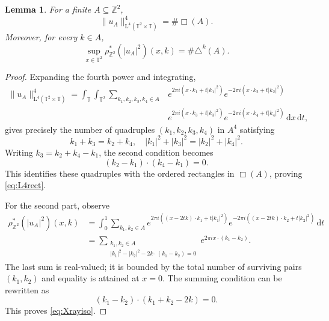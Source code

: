 \documentclass[11pt,reqno]{amsart}
\newtheorem{lemma}[theorem]{Lemma}
\numberwithin{equation}{section}
\newcommand{\dd}{\,\mathrm{d}}
\begin{document}
\begin{lemma}\label{lem:counts}
For a finite $A\subseteq\mathbb{Z}^2$,
\begin{equation}\label{eq:L4rect}
\|u_A\|_{\mathrm{L}^4(\mathbb{T}^2\times\mathbb{T})}^4 = \#\Box(A).
\end{equation}
Moreover, for every $k\in A$,
\begin{equation}\label{eq:Xrayiso}
\sup_{x\in\mathbb{T}^2}\rho^{\ast}_{\mathbb{Z}^2}(|u_A|^2)(x,k) = \#\triangle^k(A).
\end{equation}
\end{lemma}

\begin{proof}
Expanding the fourth power and integrating,
\begin{align*} 
\|u_A\|_{\mathrm{L}^4(\mathbb{T}^2\times\mathbb{T})}^4 =   \int_{\mathbb{T}} \int_{\mathbb{T}^2} \sum_{k_1,k_2,k_3,k_4\in A} & e^{2\pi i(x\cdot k_1+t|k_1|^2)} e^{-2\pi i(x\cdot k_2+t|k_2|^2)} \\
& e^{2\pi i(x\cdot k_3+t|k_3|^2)} e^{-2\pi i(x\cdot k_4+t|k_4|^2)} \dd x \dd t, 
\end{align*}
gives precisely the number of quadruples $(k_1,k_2,k_3,k_4)$ in $A^4$ satisfying
\[ k_1+k_3=k_2+k_4, \quad |k_1|^2+|k_3|^2=|k_2|^2+|k_4|^2. \]
Writing $k_3=k_2+k_4-k_1$, the second condition becomes
\[ (k_2-k_1)\cdot(k_4-k_1)=0. \]
This identifies these quadruples with the ordered rectangles in $\Box(A)$, proving \eqref{eq:L4rect}.

For the second part, observe
\begin{align*}
\rho^{\ast}_{\mathbb{Z}^2}(|u_A|^2)(x,k)
& =\int_0^1 \sum_{k_1,k_2\in A} e^{2\pi i((x-2tk)\cdot k_1+t|k_1|^2)} e^{-2\pi i((x-2tk)\cdot k_2+t|k_2|^2)} \dd t \\
& =\sum_{\substack{k_1,k_2\in A\\
|k_1|^2-|k_2|^2-2k\cdot(k_1-k_2)=0}}e^{2\pi ix\cdot(k_1-k_2)}.
\end{align*}
The last sum is real-valued; it is bounded by the total number of surviving pairs $(k_1,k_2)$ and equality is attained at $x=0$. The summing condition can be rewritten as
\[ (k_1-k_2)\cdot(k_1+k_2-2k)=0. \]
This proves \eqref{eq:Xrayiso}.
\end{proof}
\end{document}
